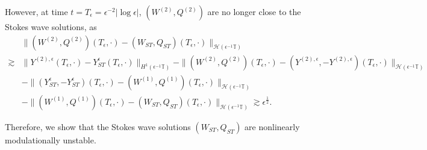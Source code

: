\documentclass[12pt]{amsart}
\theoremstyle{remark}
\theoremstyle{definition}
\numberwithin{equation}{section}
\newcommand{\e}{\epsilon}
\newcommand{\T}{\mathbb{T}}
\renewcommand{\H}{{\mathcal H }}
\newcommand{\f}{\frac}
\begin{document}
However, at time $t = T_\e = \e^{-2}|\log \e| $, $(W^{(2)}, Q^{(2)})$ are no longer close to the Stokes wave solutions, as
\begin{align*}
& \|(W^{(2)}, Q^{(2)})(T_{\e},\cdot) -  (W_{ST},Q_{ST})(T_{\e},\cdot )\|_{\H(\e^{-1}\T)} \\
\gtrsim& \|Y^{(2), \e}(T_\e,\cdot) -Y^{\e}_{ST}(T_\e,\cdot)\|_{H^1(\e^{-1}\T)}- \|(W^{(2)}, Q^{(2)})(T_\e, \cdot) -  (Y^{(2), \e}, -Y^{(2), \e})(T_\e,\cdot)\|_{\H(\e^{-1}\T)}  \\
&- \| (Y^{\e}_{ST}, -Y^{\e}_{ST})(T_\e,\cdot)-(W^{(1)}, Q^{(1)})(T_\e, \cdot)\|_{\H(\e^{-1}\T)}\\
&-   \| (W^{(1)}, Q^{(1)})(T_\e, \cdot)-(W_{ST},Q_{ST})(T_\e, \cdot)  \|_{\H(\epsilon^{-1}\T)}\gtrsim \e^{\f12}.
\end{align*}

Therefore, we show that the Stokes wave solutions $(W_{ST},Q_{ST})$ are nonlinearly modulationally unstable.

\appendix
\end{document}

